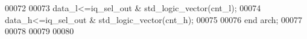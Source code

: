 \begin{DoxyCode}
00072 
00073 \textcolor{vhdlchar}{data_l}\textcolor{vhdlchar}{<=}\textcolor{vhdlchar}{iq_sel_out} \textcolor{vhdlchar}{&} \textcolor{comment}{std\_logic\_vector}\textcolor{vhdlchar}{(}\textcolor{vhdlchar}{cnt_l}\textcolor{vhdlchar}{)};
00074 \textcolor{vhdlchar}{data_h}\textcolor{vhdlchar}{<=}\textcolor{vhdlchar}{iq_sel_out} \textcolor{vhdlchar}{&} \textcolor{comment}{std\_logic\_vector}\textcolor{vhdlchar}{(}\textcolor{vhdlchar}{cnt_h}\textcolor{vhdlchar}{)};
00075   
00076 \textcolor{keywordflow}{end} \textcolor{vhdlchar}{arch};
00077 
00078 
00079 
00080 
\end{DoxyCode}
